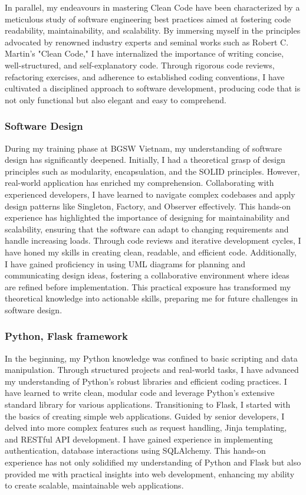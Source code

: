      \noindent In parallel, my endeavours in mastering Clean Code have been characterized by a meticulous study of software engineering best practices aimed at fostering code readability, maintainability, and scalability. By immersing myself in the principles advocated by renowned industry experts and seminal works such as Robert C. Martin's "Clean Code," I have internalized the importance of writing concise, well-structured, and self-explanatory code. Through rigorous code reviews, refactoring exercises, and adherence to established coding conventions, I have cultivated a disciplined approach to software development, producing code that is not only functional but also elegant and easy to comprehend.


    \subsubsection{Software Design}
    During my training phase at BGSW Vietnam, my understanding of software design has significantly deepened. Initially, I had a theoretical grasp of design principles such as modularity, encapsulation, and the SOLID principles. However, real-world application has enriched my comprehension. Collaborating with experienced developers, I have learned to navigate complex codebases and apply design patterns like Singleton, Factory, and Observer effectively. This hands-on experience has highlighted the importance of designing for maintainability and scalability, ensuring that the software can adapt to changing requirements and handle increasing loads. Through code reviews and iterative development cycles, I have honed my skills in creating clean, readable, and efficient code. Additionally, I have gained proficiency in using UML diagrams for planning and communicating design ideas, fostering a collaborative environment where ideas are refined before implementation. This practical exposure has transformed my theoretical knowledge into actionable skills, preparing me for future challenges in software design.


    \subsubsection{Python, Flask framework}
     In the beginning, my Python knowledge was confined to basic scripting and data manipulation. Through structured projects and real-world tasks, I have advanced my understanding of Python’s robust libraries and efficient coding practices. I have learned to write clean, modular code and leverage Python’s extensive standard library for various applications. Transitioning to Flask, I started with the basics of creating simple web applications. Guided by senior developers, I delved into more complex features such as request handling, Jinja templating, and RESTful API development. I have gained experience in implementing authentication, database interactions using SQLAlchemy. This hands-on experience has not only solidified my understanding of Python and Flask but also provided me with practical insights into web development, enhancing my ability to create scalable, maintainable web applications.
    


